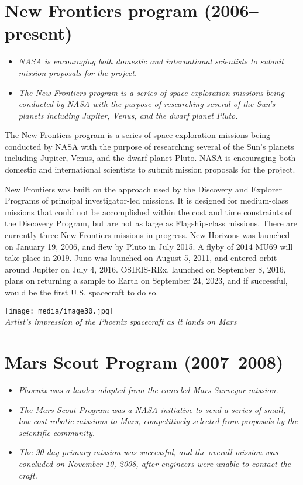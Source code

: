 \section{New Frontiers program
(2006--present)}\label{new-frontiers-program-2006present}

\begin{itemize}
\item
  \emph{NASA is encouraging both domestic and international scientists
  to submit mission proposals for the project.}
\item
  \emph{The New Frontiers program is a series of space exploration
  missions being conducted by NASA with the purpose of researching
  several of the Sun's planets including Jupiter, Venus, and the dwarf
  planet Pluto.}
\end{itemize}

The New Frontiers program is a series of space exploration missions
being conducted by NASA with the purpose of researching several of the
Sun's planets including Jupiter, Venus, and the dwarf planet Pluto. NASA
is encouraging both domestic and international scientists to submit
mission proposals for the project.

New Frontiers was built on the approach used by the Discovery and
Explorer Programs of principal investigator-led missions. It is designed
for medium-class missions that could not be accomplished within the cost
and time constraints of the Discovery Program, but are not as large as
Flagship-class missions. There are currently three New Frontiers
missions in progress. New Horizons was launched on January 19, 2006, and
flew by Pluto in July 2015. A flyby of 2014 MU69 will take place in
2019. Juno was launched on August 5, 2011, and entered orbit around
Jupiter on July 4, 2016. OSIRIS-REx, launched on September 8, 2016,
plans on returning a sample to Earth on September 24, 2023, and if
successful, would be the first U.S. spacecraft to do so.

\texttt{[image: media/image30.jpg]}\\
\emph{Artist's impression of the Phoenix spacecraft as it lands on Mars}

\section{Mars Scout Program
(2007--2008)}\label{mars-scout-program-20072008}

\begin{itemize}
\item
  \emph{Phoenix was a lander adapted from the canceled Mars Surveyor
  mission.}
\item
  \emph{The Mars Scout Program was a NASA initiative to send a series of
  small, low-cost robotic missions to Mars, competitively selected from
  proposals by the scientific community.}
\item
  \emph{The 90-day primary mission was successful, and the overall
  mission was concluded on November 10, 2008, after engineers were
  unable to contact the craft.}
\end{itemize}

